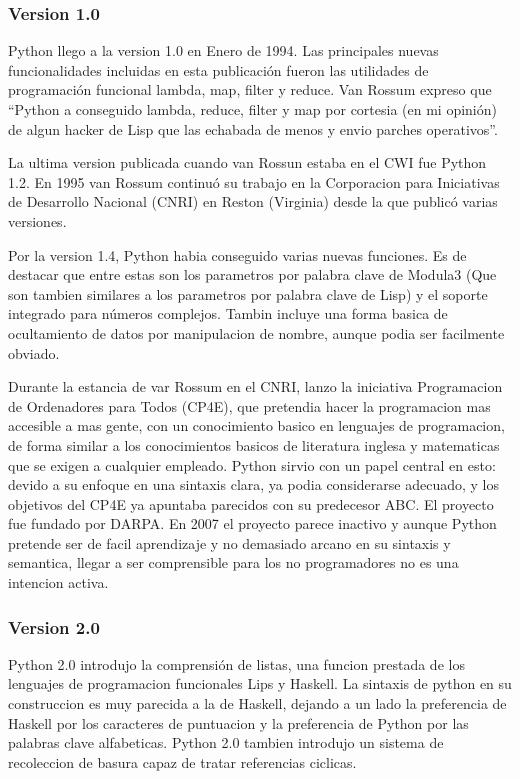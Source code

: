 \documentclass[a4paper,spanish,12pt]{book}
\begin{document}
\subsubsection{Version 1.0}

Python llego a la version 1.0 en Enero de 1994. Las principales nuevas funcionalidades incluidas en esta publicación fueron las utilidades de programación funcional lambda, map, filter y reduce. Van Rossum expreso que ``Python a conseguido lambda, reduce, filter y map por cortesia (en mi opinión) de algun hacker de Lisp que las echabada de menos y envio parches operativos''.

La ultima version publicada cuando van Rossun estaba en el CWI fue Python 1.2. En 1995 van Rossum continuó su trabajo en la Corporacion para Iniciativas de Desarrollo Nacional (CNRI) en Reston (Virginia) desde la que publicó varias versiones.

Por la version 1.4, Python habia conseguido varias nuevas funciones. Es de destacar que entre estas son los parametros por palabra clave de Modula3 (Que son tambien similares a los parametros por palabra clave de Lisp) y el soporte integrado para números complejos. Tambin incluye una forma basica de ocultamiento de datos por manipulacion de nombre, aunque podia ser facilmente obviado.

Durante la estancia de var Rossum en el CNRI, lanzo la iniciativa Programacion de Ordenadores para Todos (CP4E), que pretendia hacer la programacion mas accesible a mas gente, con un conocimiento basico en lenguajes de programacion, de forma similar a los conocimientos basicos de literatura inglesa y matematicas que se exigen a cualquier empleado. Python sirvio con un papel central en esto: devido a su enfoque en una sintaxis clara, ya podia considerarse adecuado, y los objetivos del CP4E ya apuntaba parecidos con su predecesor ABC. El proyecto fue fundado por DARPA. En 2007 el proyecto parece inactivo y aunque Python pretende ser de facil aprendizaje y no demasiado arcano en su sintaxis y semantica, llegar a ser comprensible para los no programadores no es una intencion activa.

\subsubsection{Version 2.0}

Python 2.0 introdujo la comprensión de listas, una funcion prestada de los lenguajes de programacion funcionales Lips y Haskell. La sintaxis de python en su construccion es muy parecida a la de Haskell, dejando a un lado la preferencia de Haskell por los caracteres de puntuacion y la preferencia de Python por las palabras clave alfabeticas. Python 2.0 tambien introdujo un sistema de recoleccion de basura capaz de tratar referencias ciclicas.
\end{document}
